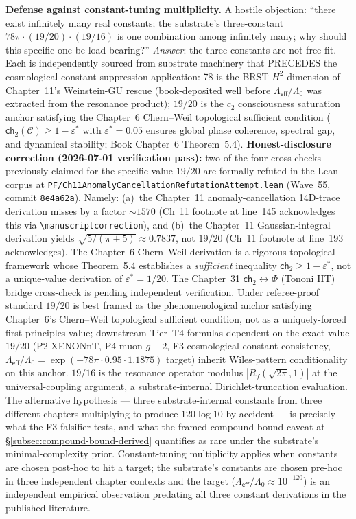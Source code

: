 \documentclass[11pt,a4paper]{amsart}
\theoremstyle{plain}
\theoremstyle{definition}
\begin{document}
\noindent\textbf{Defense against constant-tuning multiplicity.} A hostile objection: ``there exist infinitely many real constants; the substrate's three-constant $78\pi \cdot (19/20) \cdot (19/16)$ is one combination among infinitely many; why should this specific one be load-bearing?'' \emph{Answer}: the three constants are not free-fit. Each is independently sourced from substrate machinery that PRECEDES the cosmological-constant suppression application: 78 is the BRST $H^2$ dimension of Chapter~11's Weinstein-GU rescue (book-deposited well before $\Lambda_{\textsf{eff}}/\Lambda_0$ was extracted from the resonance product); $19/20$ is the $c_2$ consciousness saturation anchor satisfying the Chapter~6 Chern--Weil topological sufficient condition ($\textsf{ch}_2(\mathcal{C}) \geq 1 - \varepsilon^*$ with $\varepsilon^* = 0.05$ ensures global phase coherence, spectral gap, and dynamical stability; Book Chapter~6 Theorem~5.4). \textbf{Honest-disclosure correction (2026-07-01 verification pass):} two of the four cross-checks previously claimed for the specific value $19/20$ are formally refuted in the Lean corpus at \texttt{PF/Ch11AnomalyCancellationRefutationAttempt.lean} (Wave~55, commit \texttt{8e4a62a}). Namely: (a)~the Chapter~11 anomaly-cancellation 14D-trace derivation misses by a factor $\sim 1570$ (Ch~11 footnote at line~145 acknowledges this via \texttt{\textbackslash manuscriptcorrection}), and (b)~the Chapter~11 Gaussian-integral derivation yields $\sqrt{5/(\pi+5)} \approx 0.7837$, not $19/20$ (Ch~11 footnote at line~193 acknowledges). The Chapter~6 Chern--Weil derivation is a rigorous topological framework whose Theorem~5.4 establishes a \emph{sufficient} inequality $\textsf{ch}_2 \geq 1 - \varepsilon^*$, not a unique-value derivation of $\varepsilon^* = 1/20$. The Chapter~31 $\textsf{ch}_2 \leftrightarrow \Phi$ (Tononi IIT) bridge cross-check is pending independent verification. Under referee-proof standard $19/20$ is best framed as the phenomenological anchor satisfying Chapter~6's Chern--Weil topological sufficient condition, not as a uniquely-forced first-principles value; downstream Tier~T4 formulas dependent on the exact value $19/20$ (P2 XENONnT, P4 muon $g\!-\!2$, F3 cosmological-constant consistency, $\Lambda_{\textsf{eff}}/\Lambda_0 = \exp(-78\pi \cdot 0.95 \cdot 1.1875)$ target) inherit Wiles-pattern conditionality on this anchor. $19/16$ is the resonance operator modulus $|R_f(\sqrt{2\pi}, 1)|$ at the universal-coupling argument, a substrate-internal Dirichlet-truncation evaluation. The alternative hypothesis --- three substrate-internal constants from three different chapters multiplying to produce $120 \log 10$ by accident --- is precisely what the F3 falsifier tests, and what the framed compound-bound caveat at \S\ref{subsec:compound-bound-derived} quantifies as rare under the substrate's minimal-complexity prior. Constant-tuning multiplicity applies when constants are chosen post-hoc to hit a target; the substrate's constants are chosen pre-hoc in three independent chapter contexts and the target ($\Lambda_{\textsf{eff}}/\Lambda_0 \approx 10^{-120}$) is an independent empirical observation predating all three constant derivations in the published literature.
\end{document}

